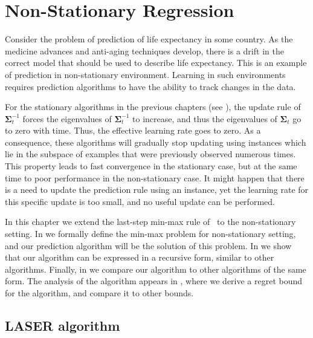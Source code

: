 \chapter{Non-Stationary Regression}

Consider the problem of prediction of life expectancy in some country.
As the medicine advances and anti-aging techniques develop, there is a drift in
the correct model that should be used to describe life expectancy.
This is an example of prediction in non-stationary environment. Learning in such
environments requires prediction algorithms to have the ability to track changes in the data.

For the stationary algorithms in the previous chapters (see ), the update rule of
$\mathbf{\Sigma}_{t}^{-1}$ forces the eigenvalues of $\mathbf{\Sigma}_{t}^{-1}$ to increase, and thus the eigenvalues of $\mathbf{\Sigma}_{t}$ go to zero with time.
Thus, the effective learning rate goes to zero.
As a consequence, these algorithms will gradually stop updating using instances
which lie in the subspace of examples that were previously observed numerous
times. This property leads to fast convergence in the stationary case, but at the
same time to poor performance in the non-stationary case. It might happen that
there is a need to update the prediction rule using an instance, yet the learning rate
for this specific update is too small, and no useful update can be performed.

In this chapter we extend the last-step min-max rule of~\cite{Forster} to the non-stationary setting.
In  we formally define the min-max problem for non-stationary setting, and
our prediction algorithm will be the solution of this problem.
In  we show that our algorithm can be expressed in a recursive form,
similar to other algorithms. Finally, in  we compare our algorithm to other algorithms of the same form.
The analysis of the algorithm appears in ,
where we derive a regret bound for the algorithm, and compare it to other bounds.


\section{LASER algorithm}
\label{sec:LASER_alg}


